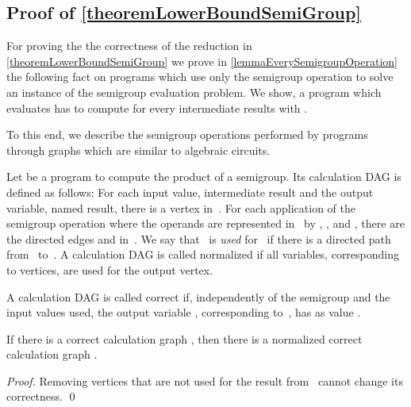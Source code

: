 \documentclass[envcountsame]{llncs}
\begin{document}
\subsection{Proof of \autoref{theoremLowerBoundSemiGroup}}
\label{appendixSemigroup}

For proving the the correctness of the reduction in \autoref{theoremLowerBoundSemiGroup} we prove in \autoref{lemmaEverySemigroupOperation} the following fact on programs which use only the semigroup operation to solve an instance of the semigroup evaluation problem.
We show, a program which evaluates  has to compute for every  intermediate results  with . 

To this end, we describe the semigroup operations performed by programs through graphs which are similar to algebraic circuits.


\begin{definition}
Let \program be a program to compute the product  of a semigroup.
Its calculation DAG \calculationDAGof{\program} is defined as follows: 
For each input value, intermediate result and the output variable, named result, there is a vertex in~\calculationDAGof{\program}.
For each application of the semigroup operation  where the operands are represented in~\calculationDAGof{\program} by , , and , there are the directed edges  and   in~\calculationDAGof{\program}.
We say that~ is \emph{used} for~ if there is a directed path from~ to~.
A calculation DAG is called normalized if all variables, corresponding to vertices, are used for the output vertex.

A calculation DAG \calculationDAG is called correct if, independently of the semigroup and the input values used, the output variable \resultVariable, corresponding to~, has as value .
\end{definition}

\begin{lemma}
If there is a correct calculation graph \calculationDAGof{\program}, then there is a normalized correct calculation graph \calculationDAG.
\end{lemma}
\begin{proof}
Removing vertices that are not used for the result from~\calculationDAGof{\program} cannot change its correctness. 
\qed
\end{proof}
\end{document}
